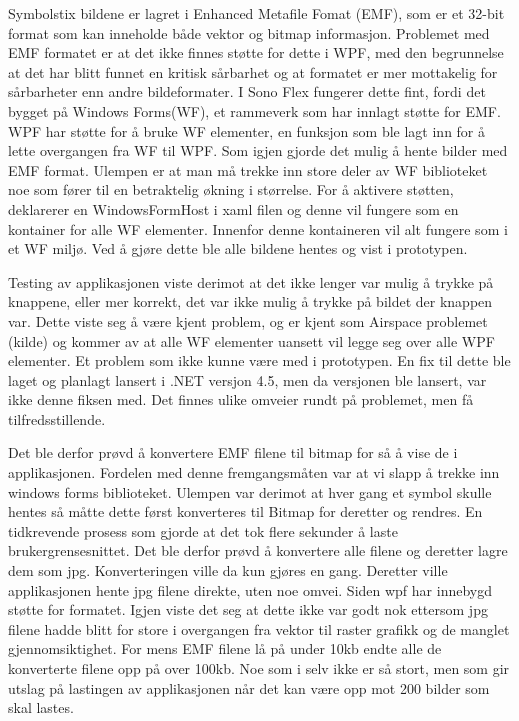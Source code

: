 {Symbolstix bildene er lagret i Enhanced Metafile Fomat (EMF), som er et 32-bit format som kan inneholde både vektor og bitmap informasjon\cite{AboutEMF}. Problemet med EMF formatet er at det ikke finnes støtte for dette i WPF, med den begrunnelse at det har blitt funnet en kritisk sårbarhet\cite{EMFVulnerability} og at formatet er mer mottakelig for sårbarheter\cite{EMFForum} enn andre bildeformater. I Sono Flex fungerer dette fint, fordi det bygget på Windows Forms(WF),  et rammeverk som har innlagt støtte for EMF. WPF har støtte for å bruke WF elementer,  en funksjon som ble lagt inn for å lette overgangen fra WF til WPF. Som igjen gjorde det mulig å hente bilder med EMF format. Ulempen er at man må trekke inn store deler av WF biblioteket noe som fører til en betraktelig økning i størrelse. For å aktivere støtten, deklarerer en WindowsFormHost i xaml filen og denne vil fungere som en kontainer for alle WF elementer. Innenfor denne kontaineren vil alt fungere som i et WF miljø. Ved å gjøre dette ble alle bildene hentes og vist i prototypen.  
 
 
Testing av applikasjonen viste derimot at det ikke lenger var mulig å trykke på knappene, eller mer korrekt, det var ikke mulig å trykke på  bildet der knappen var. Dette viste seg å være kjent problem, og er kjent som Airspace problemet (kilde) og kommer av at alle WF elementer uansett vil legge seg over alle WPF elementer. Et problem som ikke kunne være med i prototypen. En fix til dette ble laget og planlagt lansert i .NET versjon 4.5, men da versjonen ble lansert, var ikke denne fiksen med. Det finnes ulike omveier rundt på problemet, men få tilfredsstillende.  
 
 
Det ble derfor prøvd å konvertere EMF filene til bitmap for så å vise de i applikasjonen. Fordelen med denne fremgangsmåten var at vi slapp å trekke inn windows forms biblioteket. Ulempen var derimot at hver gang et symbol skulle hentes så måtte dette først konverteres til Bitmap for deretter og rendres. En tidkrevende prosess som gjorde at det tok flere sekunder å laste brukergrensesnittet. Det ble derfor prøvd å konvertere alle filene og deretter lagre dem som jpg. Konverteringen ville da kun gjøres en gang. Deretter ville applikasjonen hente jpg filene direkte, uten noe omvei. Siden wpf har innebygd støtte for formatet. Igjen viste det seg at dette ikke var godt nok ettersom jpg filene hadde blitt for store i overgangen fra vektor til raster grafikk og de manglet gjennomsiktighet. For mens EMF filene lå på under 10kb endte alle de konverterte filene opp på over 100kb. Noe som i selv ikke er så stort, men som gir utslag på lastingen av applikasjonen når det kan være opp mot 200 bilder som skal lastes. 
 
}
